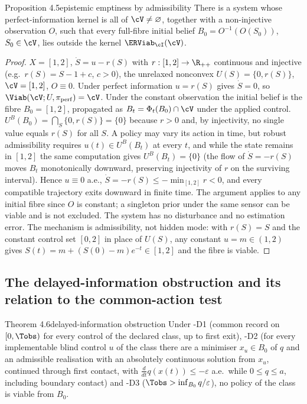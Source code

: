 \begin{restated}{Proposition 4.5}{epistemic emptiness by admissibility}
There is a system whose perfect-information kernel is all of $\cV\ne\varnothing$, together with a non-injective observation $O$, such that every full-fibre initial belief $B_0=O^{-1}(O(S_0))$, $S_0\in\cV$, lies outside the kernel $\ERViab_\cI(\cV)$.
\end{restated}

\begin{proof}
$X=[1,2]$, $\dot S=u-r(S)$ with $r:[1,2]\to\R_{++}$ continuous and injective (e.g.\ $r(S)=S-1+c$, $c>0$), the unrelaxed nonconvex $U(S)=\{0,r(S)\}$, $\cV=[1,2]$, $O\equiv0$. Under perfect information $u=r(S)$ gives $\dot S=0$, so $\Viab(\cV;U,\pi_{\mathrm{perf}})=\cV$. Under the constant observation the initial belief is the fibre $B_0=[1,2]$, propagated as $B_t=\Phi_t(B_0)\cap\cV$ under the applied control. $U^B(B_0)=\bigcap_{S}\{0,r(S)\}=\{0\}$ because $r>0$ and, by injectivity, no single value equals $r(S)$ for all $S$. A policy may vary its action in time, but robust admissibility requires $u(t)\in U^B(B_t)$ at every $t$, and while the state remains in $[1,2]$ the same computation gives $U^B(B_t)=\{0\}$ (the flow of $\dot S=-r(S)$ moves $B_t$ monotonically downward, preserving injectivity of $r$ on the surviving interval). Hence $u\equiv0$ a.e., $\dot S=-r(S)\le-\min_{[1,2]}r<0$, and every compatible trajectory exits downward in finite time. The argument applies to any initial fibre since $O$ is constant; a singleton prior under the same sensor can be viable and is not excluded. The system has no disturbance and no estimation error. The mechanism is admissibility, not hidden mode: with $r(S)=S$ and the constant control set $[0,2]$ in place of $U(S)$, any constant $u=m\in(1,2)$ gives $S(t)=m+(S(0)-m)e^{-t}\in[1,2]$ and the fibre is viable.
\end{proof}

\subsection{The delayed-information obstruction and its relation to the common-action test}\label{S:delayed}

\begin{restated}{Theorem 4.6}{delayed-information obstruction}
Under \hyp{D1} (common record on $[0,\Tobs)$ for every control of the declared class, up to first exit), \hyp{D2} (for every implementable blind control $u$ of the class there are a minimiser $x_u\in B_0$ of $q$ and an admissible realisation with an absolutely continuous solution from $x_u$, continued through first contact, with $\tfrac{d}{dt}q(x(t))\le-\varepsilon$ a.e.\ while $0\le q\le a$, including boundary contact) and \hyp{D3} ($\Tobs>\inf_{B_0}q/\varepsilon$), no policy of the class is viable from $B_0$.
\end{restated}

